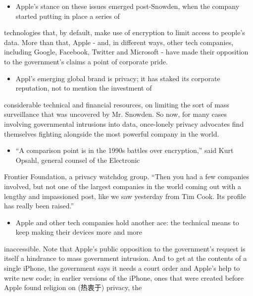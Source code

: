\documentclass[UTF8,11pt]{ctexart}
\begin{document}
\begin{itemize}[leftmargin=2em,itemsep=.2em,topsep=.4em]\item[G.] Apple’s stance on these issues emerged post-Snowden, when the company started putting in place a series of
\end{itemize}

technologies that, by default, make use of encryption to limit access to people’s data. More than that, Apple - and, in different ways, other tech companies, including Google, Facebook, Twitter and Microsoft - have made their opposition to the government’s claims a point of corporate pride.


\begin{itemize}[leftmargin=2em,itemsep=.2em,topsep=.4em]\item[H.] Appl’s emerging global brand is privacy; it has staked its corporate reputation, not to mention the investment of
\end{itemize}

considerable technical and financial resources, on limiting the sort of mass surveillance that was uncovered by Mr. Snowden. So now, for many cases involving governmental intrusions into data, once-lonely privacy advocates find themselves fighting alongside the most powerful company in the world.


\begin{itemize}[leftmargin=2em,itemsep=.2em,topsep=.4em]\item[I.] “A comparison point is in the 1990s battles over encryption,” said Kurt Opsahl, general counsel of the Electronic
\end{itemize}

Frontier Foundation, a privacy watchdog group. “Then you had a few companies involved, but not one of the largest companies in the world coming out with a lengthy and impassioned post, like we saw yesterday from Tim Cook. Its profile has really been raised.”


\begin{itemize}[leftmargin=2em,itemsep=.2em,topsep=.4em]\item[J.] Apple and other tech companies hold another ace: the technical means to keep making their devices more and more
\end{itemize}

inaccessible. Note that Apple’s public opposition to the government’s request is itself a hindrance to mass government intrusion. And to get at the contents of a single iPhone, the government says it needs a court order and Apple’s help to write new code; in earlier versions of the iPhone, ones that were created before Apple found religion on (热衷于) privacy, the
\end{document}

